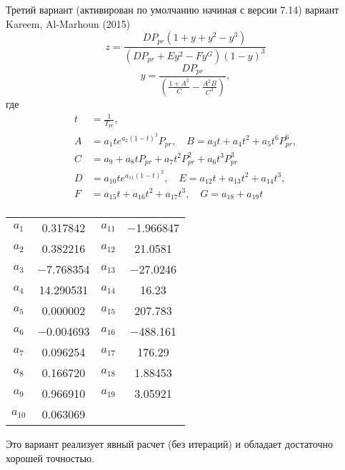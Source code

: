 Третий вариант (активирован по умолчанию начиная с версии 7.14) вариант Kareem, Al-Marhoun (2015) \cite{Kareem_2015}
$$
z = \frac{{ DP_{pr} (1 + y + y^{2} - y^{3} )}}{{(DP_{pr} + Ey^{2} - Fy^{G} )(1 - y)^{3} }}
$$ 
$$
y = \frac{{ DP_{pr} }}{{\left( {\frac{{1 + A^{2} }}{C} - \frac{{A^{2} B}}{{C^{3} }}} \right)}},
$$
где
$$
\begin{aligned} t & = \frac{1}{{T_{pr} }}, \\ A & = a_{1} te^{{a_{2} (1 - t)^{2} }} P_{pr} , \quad B = a_{3} t + a_{4} t^{2} + a_{5} t^{6} P_{pr}^{6} , \\ C & = a_{9} + a_{8} tP_{pr} + a_{7} t^{2} P_{pr}^{2} + a_{6} t^{3} P_{pr}^{3} \\ D & = a_{10} te^{{a_{11} (1 - t)^{2} }} , \quad E = a_{12} t + a_{13} t^{2} + a_{14} t^{3} , \\ F & = a_{15} t + a_{16} t^{2} + a_{17} t^{3} ,\quad G = a_{18} + a_{19} t \\ \end{aligned}
$$
	\begin{center}
		\begin{tabular}{cccc}
			
			$a_1$ & 0.317842  & $a_{11}$ & −1.966847  \\
			
			$a_2$ & 0.382216  & $a_{12}$ & 21.0581  \\
			
			$a_3$ & −7.768354 & $a_{13}$ & −27.0246  \\
			
			$a_4$ & 14.290531  & $a_{14}$ & 16.23  \\
			
			$a_5$ & 0.000002  & $a_{15}$ & 207.783  \\
			
			$a_6$ & −0.004693  & $a_{16}$ & −488.161  \\
			
			$a_7$ & 0.096254  & $a_{17}$ & 176.29  \\
			
			$a_8$ & 0.166720  & $a_{18}$ & 1.88453  \\
			
			$a_9$ & 0.966910  & $a_{19}$ & 3.05921  \\
			
			$a_{10}$ & 0.063069  &  &  \\
			
		\end{tabular}
	\end{center}
Это вариант реализует явный расчет (без итераций) и обладает достаточно хорошей точностью. 

